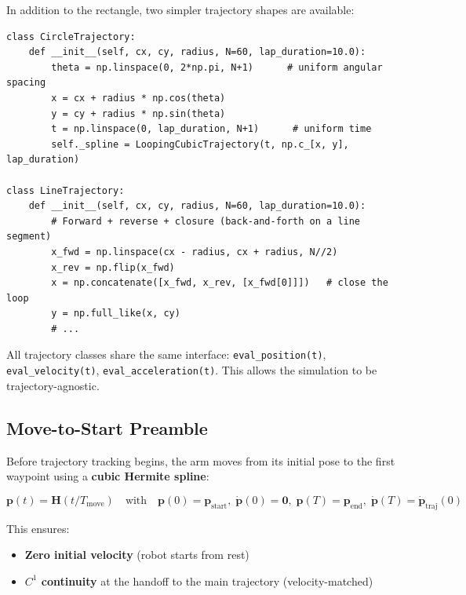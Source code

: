 \documentclass[11pt,a4paper]{article}
\begin{document}
In addition to the rectangle, two simpler trajectory shapes are available:

\begin{lstlisting}[caption={Circle and line trajectory constructors --- \texttt{rl/trajectory.py}}]
class CircleTrajectory:
    def __init__(self, cx, cy, radius, N=60, lap_duration=10.0):
        theta = np.linspace(0, 2*np.pi, N+1)      # uniform angular spacing
        x = cx + radius * np.cos(theta)
        y = cy + radius * np.sin(theta)
        t = np.linspace(0, lap_duration, N+1)      # uniform time
        self._spline = LoopingCubicTrajectory(t, np.c_[x, y], lap_duration)

class LineTrajectory:
    def __init__(self, cx, cy, radius, N=60, lap_duration=10.0):
        # Forward + reverse + closure (back-and-forth on a line segment)
        x_fwd = np.linspace(cx - radius, cx + radius, N//2)
        x_rev = np.flip(x_fwd)
        x = np.concatenate([x_fwd, x_rev, [x_fwd[0]]])   # close the loop
        y = np.full_like(x, cy)
        # ...
\end{lstlisting}

All trajectory classes share the same interface: \texttt{eval\_position(t)}, \texttt{eval\_velocity(t)}, \texttt{eval\_acceleration(t)}.  This allows the simulation to be trajectory-agnostic.

\subsection{Move-to-Start Preamble}

Before trajectory tracking begins, the arm moves from its initial pose to the first waypoint using a \textbf{cubic Hermite spline}:

\begin{equation}
    \bm{p}(t) = \bm{H}(t/T_{\mathrm{move}}) \quad \text{with} \quad
    \bm{p}(0) = \bm{p}_{\mathrm{start}},\;
    \dot{\bm{p}}(0) = \bm{0},\;
    \bm{p}(T) = \bm{p}_{\mathrm{end}},\;
    \dot{\bm{p}}(T) = \dot{\bm{p}}_{\mathrm{traj}}(0)
\end{equation}

This ensures:
\begin{itemize}[leftmargin=2em]
    \item \textbf{Zero initial velocity} (robot starts from rest)
    \item \textbf{$C^1$ continuity} at the handoff to the main trajectory (velocity-matched)
\end{itemize}
\end{document}
